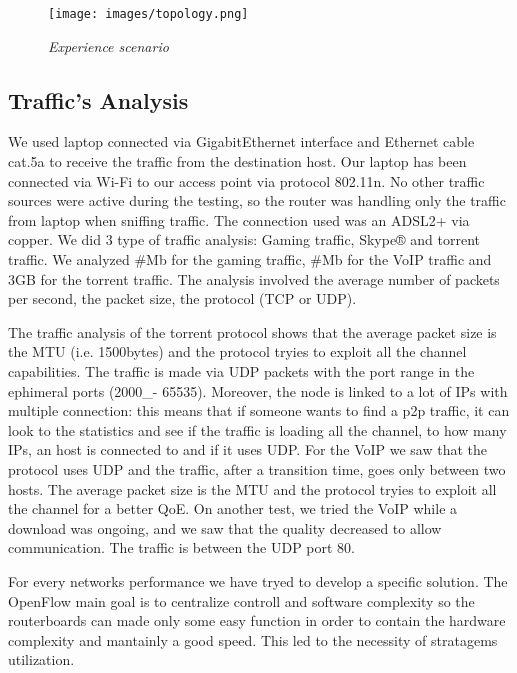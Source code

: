 \documentclass[article,10pt]{IEEEtran}
\begin{document}
  \begin{figure}[!h]
 \centering
 \texttt{[image: images/topology.png]}
 \caption{\emph{Experience scenario}}
 \label{fig:topo}
  \end{figure}
 
 
\subsection{Traffic's Analysis}\label{subsec:traf}
We used laptop connected via
GigabitEthernet interface and Ethernet cable cat.5a to receive the traffic from the destination host.
Our laptop has been connected via Wi-Fi to our access point via protocol 802.11n.
No other traffic sources were active during the testing, so the router was handling only
the traffic from laptop when sniffing traffic. The connection used was an ADSL2+ via copper.
We did 3 type of traffic analysis: Gaming traffic, Skype® and torrent traffic. We analyzed
\#Mb for the gaming traffic, \#Mb for the VoIP traffic and 3GB for the torrent traffic.
The analysis involved the average number of packets per second, the packet size, the protocol (TCP or UDP).

The traffic analysis of the torrent protocol shows that the average packet size is the MTU
(i.e. 1500bytes) and the protocol tryies to exploit all the channel capabilities. The traffic
is made via UDP packets with the port range in the ephimeral ports (2000_- 65535).
Moreover, the node is linked to a lot of IPs with multiple connection: this means that
if someone wants to find a p2p traffic, it can look to the statistics and see if the traffic is loading all the channel,
to how many IPs, an host is connected to and if it uses UDP.
For the VoIP we saw that the protocol uses UDP and the traffic, after a transition time, goes only between two hosts.
The average packet size is the MTU and the protocol tryies to exploit all the channel for a better QoE.
On another test, we tried the VoIP while a download was ongoing, and we saw that the quality
decreased to allow communication. The traffic is between the UDP port 80.

  For every networks performance we have tryed to develop a specific solution. The OpenFlow main goal is to centralize controll and software
  complexity so the routerboards can made only some easy function in order to contain the hardware complexity and mantainly a good speed\cite{qos_paper}.
  This led to the necessity of stratagems utilization.
  
\end{document}
